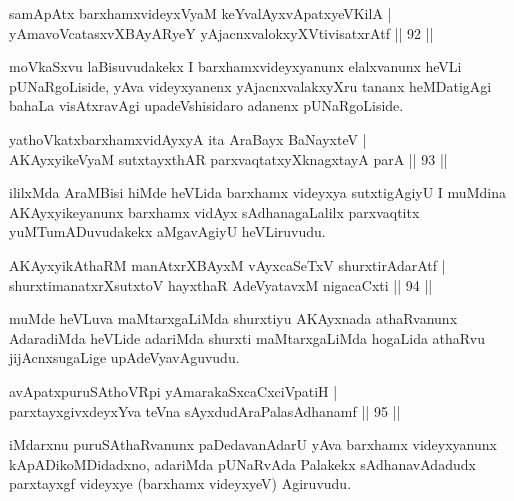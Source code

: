 \begin{shl}
samApAtx barxhamxvideyxVyaM keYvalAyxvApatxyeV\s KilA |\\
yAmavoVcatasxvXBAyARyeY yAjacnxvalokxyXV\s tivisatxrAtf \hfill || 92 ||
\end{shl}

\begin{artha}
moVkaSxvu laBisuvudakekx I barxhamxvideyxyanunx elalxvanunx heVLi pUNaRgoLiside, yAva videyxyanenx yAjacnxvalakxyXru tananx heMDatigAgi bahaLa visAtxravAgi upadeVshisidaro adanenx pUNaRgoLiside.
\end{artha}

\begin{shl}
yathoVkatxbarxhamxvidAyxyA ita AraBayx BaNayxteV |\\
AKAyxyikeVyaM sutxtayxthAR parxvaqtatxyXknagxtayA parA \hfill || 93 ||
\end{shl}

\begin{artha}
ililxMda AraMBisi hiMde heVLida barxhamx videyxya sutxtigAgiyU I muMdina AKAyxyikeyanunx barxhamx vidAyx sAdhanagaLalilx parxvaqtitx yuMTumADuvudakekx aMgavAgiyU heVLiruvudu.
\end{artha}


\begin{shl}
AKAyxyikAthaRM manAtxrXBAyxM vAyxcaSeTxV shurxtirAdarAtf |\\
shurxtimanatxrXsutxtoV hayxthaR AdeVyatavxM nigacaCxti \hfill || 94 ||
\end{shl}

\begin{artha}
muMde heVLuva maMtarxgaLiMda shurxtiyu AKAyxnada athaRvanunx AdaradiMda heVLide adariMda shurxti maMtarxgaLiMda hogaLida athaRvu jijAcnxsugaLige upAdeVyavAguvudu.
\end{artha}


\begin{shl}
avApatxpuruSAthoVR\s pi yAmarakaSxcaCxciVpatiH |\\
parxtayxgivxdeyxYva teVna sAyxdudAraPalasAdhanamf \hfill || 95 ||
\end{shl}

\begin{artha}
iMdarxnu puruSAthaRvanunx paDedavanAdarU yAva barxhamx videyxyanunx kApADikoMDidadxno, adariMda pUNaRvAda Palakekx sAdhanavAdadudx parxtayxgf videyxye (barxhamx videyxyeV) Agiruvudu.
\end{artha}

